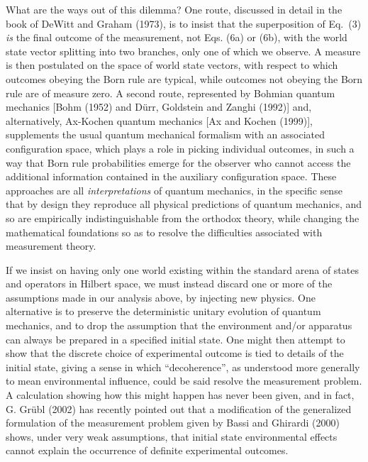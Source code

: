 What are the ways out of this dilemma?  One route, discussed in detail 
in the book of DeWitt and Graham (1973), is to insist that the superposition 
of Eq.~(3) {\it is} the final outcome of the measurement, not Eqs. (6a) or 
(6b), with the world state vector splitting into two branches, only one of 
which we observe.  A measure is then postulated on the space of world 
state vectors, with respect to which outcomes obeying the Born rule are 
typical, while outcomes not obeying the Born rule are of measure zero.   
A second route, represented 
by Bohmian quantum mechanics [Bohm (1952) and  D\"urr, Goldstein and 
Zanghi (1992)] and, alternatively, Ax-Kochen quantum mechanics 
[Ax and Kochen (1999)], 
supplements the usual quantum mechanical formalism with an associated 
configuration space, which plays a role in picking individual outcomes,   
in such a way that Born rule probabilities emerge for the observer who  
cannot access the additional information contained in the auxiliary  
configuration  space. These approaches are all {\it interpretations} of 
quantum mechanics, in the specific sense 
that by design they reproduce all physical predictions 
of quantum mechanics, and so are empirically indistinguishable 
from the orthodox theory, 
while changing the mathematical foundations so as to resolve the difficulties 
associated with measurement theory.    

If we insist on having only one world existing within the standard   
arena of states and operators in Hilbert space, we must instead 
discard one or more 
of the assumptions made in our analysis above, by injecting new physics.    
One alternative is to preserve 
the deterministic unitary evolution of quantum mechanics, and to 
drop the assumption that the environment and/or apparatus 
can always be prepared in a 
specified initial state. One might then attempt to show that the discrete 
choice of experimental outcome is tied to details of the  
initial state, giving a sense in which ``decoherence'', as understood   
more generally to mean environmental influence, 
could be said resolve the measurement 
problem.  A calculation showing how this might happen has never been 
given, and in fact, G. Gr\"ubl (2002) has recently pointed out that a 
modification of the generalized formulation of the measurement 
problem given by Bassi and Ghirardi (2000) shows, under very 
weak assumptions,  that initial state  
environmental effects cannot explain the occurrence of definite experimental  
outcomes.    


